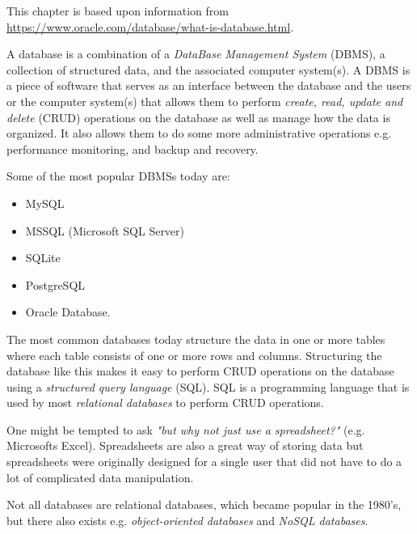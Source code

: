This chapter is based upon information from \url{https://www.oracle.com/database/what-is-database.html}.

A database is a combination of a \textit{DataBase Management System} (DBMS), a collection of structured data, and the associated computer system(s).
A DBMS is a piece of software that serves as an interface between the database and the users or the computer system(s) that allows them to perform \textit{create, read, update and delete} (CRUD) operations on the database as well as manage how the data is organized. It also allows them to do some more administrative operations e.g. performance monitoring, and backup and recovery.

Some of the most popular DBMSs today are:  %
\begin{itemize}
        \item MySQL
        \item MSSQL (Microsoft SQL Server)
        \item SQLite
        \item PostgreSQL
        \item Oracle Database.
\end{itemize}

The most common databases today structure the data in one or more tables where each table consists of one or more rows and columns. Structuring the database like this makes it easy to perform CRUD operations on the database using a \textit{structured query language} (SQL). SQL is a programming language that is used by most \textit{relational databases} to perform CRUD operations.

One might be tempted to ask \textit{"but why not just use a spreadsheet?"} (e.g. Microsofts Excel). Spreadsheets are also a great way of storing data but spreadsheets were originally designed for a single user that did not have to do a lot of complicated data manipulation.

Not all databases are relational databases, which became popular in the 1980's, but there also exists e.g. \textit{object-oriented databases} and \textit{NoSQL databases}. 
